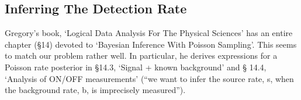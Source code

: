 \documentclass[twocolumn,nofootinbib]{revtex4-1}
\begin{document}
%

\subsection{Inferring The Detection Rate}
Gregory's book, `Logical Data Analysis For The Physical Sciences' has an entire
chapter (\S 14) devoted to `Bayesian Inference With Poisson Sampling'.  This
seems to match our problem rather well.  In particular, he derives expressions
for a Poisson rate posterior in \S 14.3, `Signal + known background' and \S
14.4, `Analysis of ON/OFF measurements' (``we want to infer the source rate, s,
when the background rate, b, is imprecisely measured'').
\end{document}
